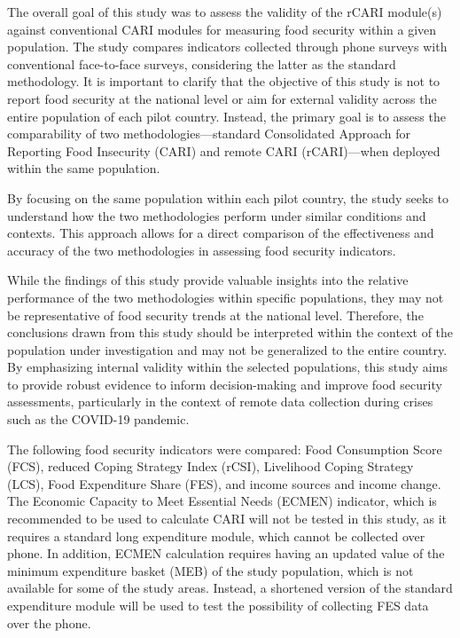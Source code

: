 \documentclass[11pt,harvard]{article}
\begin{document}
The overall goal of this study was to assess the validity of the rCARI module(s) against conventional CARI modules for measuring food security within a given population. The study compares indicators collected through phone surveys with conventional face-to-face surveys, considering the latter as the standard methodology. It is important to clarify that the objective of this study is not to report food security at the national level or aim for external validity across the entire population of each pilot country. Instead, the primary goal is to assess the comparability of two methodologies—standard Consolidated Approach for Reporting Food Insecurity (CARI) and remote CARI (rCARI)—when deployed within the same population.

By focusing on the same population within each pilot country, the study seeks to understand how the two methodologies perform under similar conditions and contexts. This approach allows for a direct comparison of the effectiveness and accuracy of the two methodologies in assessing food security indicators.

While the findings of this study provide valuable insights into the relative performance of the two methodologies within specific populations, they may not be representative of food security trends at the national level. Therefore, the conclusions drawn from this study should be interpreted within the context of the population under investigation and may not be generalized to the entire country. By emphasizing internal validity within the selected populations, this study aims to provide robust evidence to inform decision-making and improve food security assessments, particularly in the context of remote data collection during crises such as the COVID-19 pandemic.

The following food security indicators were compared: Food Consumption Score (FCS), reduced Coping Strategy Index (rCSI), Livelihood Coping Strategy (LCS), Food Expenditure Share (FES), and income sources and income change. The Economic Capacity to Meet Essential Needs (ECMEN) indicator, which is recommended to be used to calculate CARI will not be tested in this study, as it requires a standard long expenditure module, which cannot be collected over phone. In addition, ECMEN calculation requires having an updated value of the minimum expenditure basket (MEB) of the study population, which is not available for some of the study areas. Instead, a shortened version of the standard expenditure module will be used to test the possibility of collecting FES data over the phone.
\end{document}
